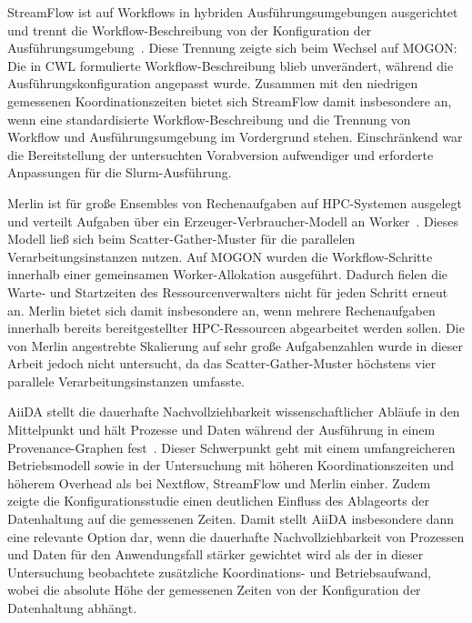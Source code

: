 StreamFlow ist auf Workflows in hybriden Ausführungsumgebungen
ausgerichtet und trennt die Workflow-Beschreibung von der
Konfiguration der
Ausführungsumgebung~\cite{colonnelli2021streamflow}. Diese Trennung
zeigte sich beim Wechsel auf MOGON: Die in CWL formulierte
Workflow-Beschreibung blieb unverändert, während die
Ausführungskonfiguration angepasst wurde. Zusammen mit den
niedrigen gemessenen Koordinationszeiten bietet sich StreamFlow
damit insbesondere an, wenn eine standardisierte
Workflow-Beschreibung und die Trennung von Workflow und
Ausführungsumgebung im Vordergrund stehen. Einschränkend war die
Bereitstellung der untersuchten Vorabversion aufwendiger und
erforderte Anpassungen für die Slurm-Ausführung.

Merlin ist für große Ensembles von Rechenaufgaben auf HPC-Systemen
ausgelegt und verteilt Aufgaben über ein
Erzeuger-Verbraucher-Modell an
Worker~\cite{peterson2022merlin}. Dieses Modell ließ sich beim
Scatter-Gather-Muster für die parallelen Verarbeitungsinstanzen
nutzen. Auf MOGON wurden die Workflow-Schritte innerhalb einer
gemeinsamen Worker-Allokation ausgeführt. Dadurch fielen die
Warte- und Startzeiten des Ressourcenverwalters nicht für jeden
Schritt erneut an. Merlin bietet sich damit insbesondere an, wenn
mehrere Rechenaufgaben innerhalb bereits bereitgestellter
HPC-Ressourcen abgearbeitet werden sollen. Die von Merlin
angestrebte Skalierung auf sehr große Aufgabenzahlen wurde in
dieser Arbeit jedoch nicht untersucht, da das
Scatter-Gather-Muster höchstens vier parallele
Verarbeitungsinstanzen umfasste.

AiiDA stellt die dauerhafte Nachvollziehbarkeit wissenschaftlicher
Abläufe in den Mittelpunkt und hält Prozesse und Daten während der
Ausführung in einem Provenance-Graphen
fest~\cite{huber2020aiida}. Dieser Schwerpunkt geht mit einem
umfangreicheren Betriebsmodell sowie in der Untersuchung mit
höheren Koordinationszeiten und höherem Overhead als bei Nextflow,
StreamFlow und Merlin einher. Zudem zeigte die Konfigurationsstudie
einen deutlichen Einfluss des Ablageorts der Datenhaltung auf die
gemessenen Zeiten. Damit stellt AiiDA insbesondere dann eine relevante Option dar, wenn die dauerhafte Nachvollziehbarkeit von Prozessen und Daten
für den Anwendungsfall stärker gewichtet wird als der in dieser
Untersuchung beobachtete zusätzliche Koordinations- und
Betriebsaufwand, wobei die absolute Höhe der
gemessenen Zeiten von der Konfiguration der Datenhaltung abhängt.

